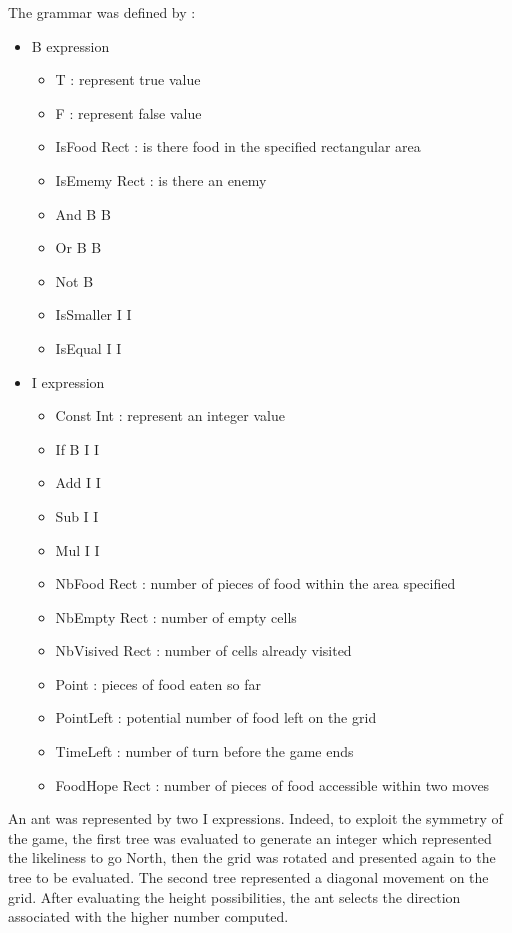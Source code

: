 \documentclass[10pt,a4paper]{article}
\begin{document}
The grammar was defined by :
\begin{itemize}
\item B expression
  \begin{itemize}
    \item T : represent true value 
    \item F : represent false value
    \item IsFood Rect : is there food in the specified rectangular area
    \item IsEmemy Rect : is there an enemy
    \item And B B
    \item Or B B
    \item Not B
    \item IsSmaller I I
    \item IsEqual I I
  \end{itemize}
\item I expression
  \begin{itemize}
  \item Const Int : represent an integer value
  \item If B I I
  \item Add I I
  \item Sub I I
  \item Mul I I
  \item NbFood Rect : number of pieces of food within the area specified
  \item NbEmpty Rect : number of empty cells
  \item NbVisived Rect : number of cells already visited
  \item Point : pieces of food eaten so far
  \item PointLeft : potential number of food left on the grid
  \item TimeLeft : number of turn before the game ends
  \item FoodHope Rect : number of pieces of food accessible within two moves
  \end{itemize}
\end{itemize}

An ant was represented by two I expressions. Indeed, to exploit the
symmetry of the game, the first tree was evaluated to generate an
integer which represented the likeliness to go North, then the grid was
rotated and presented again to the tree to be evaluated. The second
tree represented a diagonal movement on the grid. After evaluating the
height possibilities, the ant selects the direction associated with
the higher number computed.\\
\end{document}
